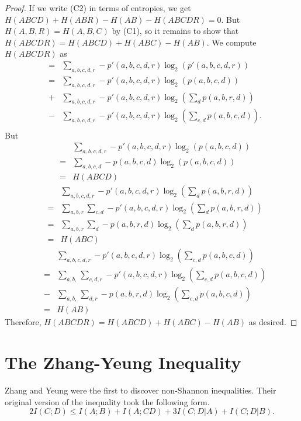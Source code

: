 \documentclass[10pt,journal]{IEEEtran}
\begin{document}
\begin{proof}
If we write (C2) in terms of entropies, we get
$H(ABCD)+H(ABR)-H(AB)-H(ABCDR)=0$.  But $H(A,B,R)=H(A,B,C)$ by (C1), so it remains to show that
$H(ABCDR)=H(ABCD)+H(ABC)-H(AB)$.  We compute $H(ABCDR)$ as
\begin{eqnarray*}
&=& \sum_{a,b,c,d,r} -p'(a,b,c,d,r)\log_2(p'(a,b,c,d,r))\\
&=&  \sum_{a,b,c,d,r} -p'(a,b,c,d,r)\log_2(p(a,b,c,d))\\
&+&  \sum_{a,b,c,d,r} -p'(a,b,c,d,r)\log_2(\sum_d p(a,b,r,d))\\
&-&  \sum_{a,b,c,d,r} -p'(a,b,c,d,r)\log_2(\sum_{c,d} p(a,b,c,d)).\\
\end{eqnarray*}
But
\begin{eqnarray*}
&& \sum_{a,b,c,d,r} -p'(a,b,c,d,r)\log_2(p(a,b,c,d))\\
&=&  \sum_{a,b,c,d} -p(a,b,c,d)\log_2(p(a,b,c,d))\\
&=& H(ABCD)
\end{eqnarray*}
\begin{eqnarray*}
&&\sum_{a,b,c,d,r} -p'(a,b,c,d,r)\log_2(\sum_d p(a,b,r,d))\\
&=&  \sum_{a,b,r} \sum_{c,d}-p'(a,b,c,d,r)\log_2(\sum_d p(a,b,r,d))\\
&=&  \sum_{a,b,r} \sum_d -p(a,b,r,d)\log_2(\sum_d p(a,b,r,d))\\
&=& H(ABC)
\end{eqnarray*}
\begin{eqnarray*}
&&  \sum_{a,b,c,d,r}-p'(a,b,c,d,r)\log_2(\sum_{c,d} p(a,b,c,d))\\
&=&  \sum_{a,b,} \sum_{c,d,r}-p'(a,b,c,d,r)\log_2(\sum_{c,d} p(a,b,c,d))\\
&-&  \sum_{a,b,} \sum_{d,r}-p(a,b,r,d)\log_2(\sum_{c,d} p(a,b,c,d))\\
&=& H(AB)
\end{eqnarray*}
Therefore, $H(ABCDR)=H(ABCD)+H(ABC)-H(AB)$ as desired.
\end{proof}


\section{The Zhang-Yeung Inequality}\label{ZY}


Zhang and Yeung were the first to discover non-Shannon inequalities.  Their original version of the inequality
took the following form.
$$
2I(C;D) \leq I(A;B)+I(A;CD)+3I(C;D|A) + I(C;D|B).
$$
\end{document}
